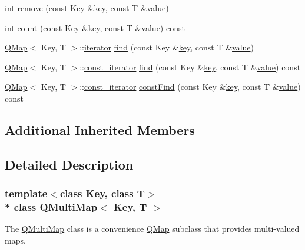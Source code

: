 \begin{DoxyCompactItemize}
\item 
int \hyperlink{class_q_multi_map_a324e0c0f288ed749033c9df20efd88fa}{remove} (const Key \&\hyperlink{class_q_map_a7ad0c404885c5287fe593849e4bc80d6}{key}, const T \&\hyperlink{class_q_map_ab9c04f61f4abd94439d4431118a238e5}{value})
\item 
int \hyperlink{class_q_multi_map_abb89579656320a453ea7c80b2702d8c5}{count} (const Key \&\hyperlink{class_q_map_a7ad0c404885c5287fe593849e4bc80d6}{key}, const T \&\hyperlink{class_q_map_ab9c04f61f4abd94439d4431118a238e5}{value}) const 
\item 
\hyperlink{class_q_map}{Q\+Map}$<$ Key, T $>$\+::\hyperlink{class_q_map_1_1iterator}{iterator} \hyperlink{class_q_multi_map_ade33defb37a1abf5f4fff2686159afd4}{find} (const Key \&\hyperlink{class_q_map_a7ad0c404885c5287fe593849e4bc80d6}{key}, const T \&\hyperlink{class_q_map_ab9c04f61f4abd94439d4431118a238e5}{value})
\item 
\hyperlink{class_q_map}{Q\+Map}$<$ Key, T $>$\+::\hyperlink{class_q_map_1_1const__iterator}{const\+\_\+iterator} \hyperlink{class_q_multi_map_a84abf87a0d54493e9ecaa0e7fa4d5c62}{find} (const Key \&\hyperlink{class_q_map_a7ad0c404885c5287fe593849e4bc80d6}{key}, const T \&\hyperlink{class_q_map_ab9c04f61f4abd94439d4431118a238e5}{value}) const 
\item 
\hyperlink{class_q_map}{Q\+Map}$<$ Key, T $>$\+::\hyperlink{class_q_map_1_1const__iterator}{const\+\_\+iterator} \hyperlink{class_q_multi_map_ab0c0991e1c637c400b0d874f4a05b5ef}{const\+Find} (const Key \&\hyperlink{class_q_map_a7ad0c404885c5287fe593849e4bc80d6}{key}, const T \&\hyperlink{class_q_map_ab9c04f61f4abd94439d4431118a238e5}{value}) const 
\end{DoxyCompactItemize}
\subsection*{Additional Inherited Members}


\subsection{Detailed Description}
\subsubsection*{template$<$class Key, class T$>$\\*
class Q\+Multi\+Map$<$ Key, T $>$}

The \hyperlink{class_q_multi_map}{Q\+Multi\+Map} class is a convenience \hyperlink{class_q_map}{Q\+Map} subclass that provides multi-\/valued maps. 

